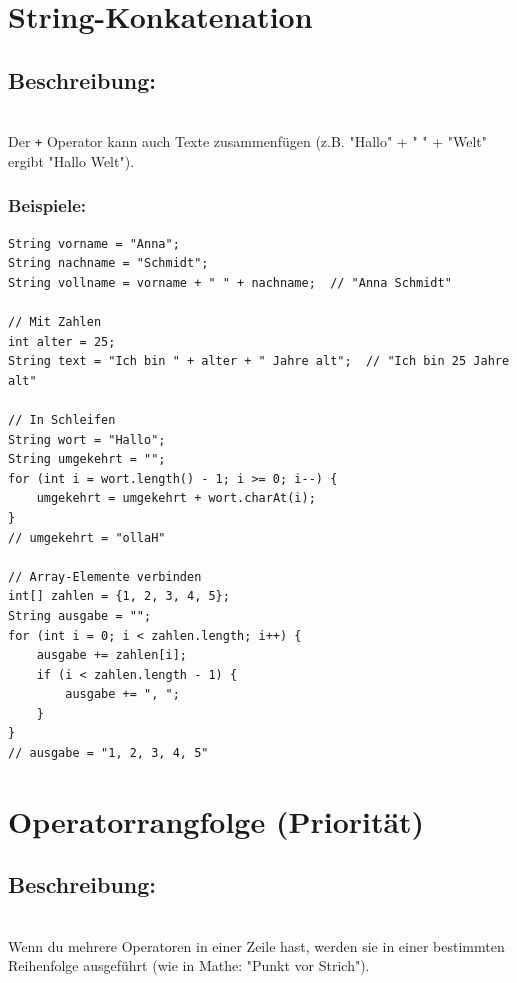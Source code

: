 \section*{String-Konkatenation}

\subsection*{Beschreibung:}\\
Der \texttt{+} Operator kann auch Texte zusammenfügen (z.B. "Hallo" + " " + "Welt" ergibt "Hallo Welt").

\subsubsection*{Beispiele:}
\begin{lstlisting}
String vorname = "Anna";
String nachname = "Schmidt";
String vollname = vorname + " " + nachname;  // "Anna Schmidt"

// Mit Zahlen
int alter = 25;
String text = "Ich bin " + alter + " Jahre alt";  // "Ich bin 25 Jahre alt"

// In Schleifen
String wort = "Hallo";
String umgekehrt = "";
for (int i = wort.length() - 1; i >= 0; i--) {
    umgekehrt = umgekehrt + wort.charAt(i);
}
// umgekehrt = "ollaH"

// Array-Elemente verbinden
int[] zahlen = {1, 2, 3, 4, 5};
String ausgabe = "";
for (int i = 0; i < zahlen.length; i++) {
    ausgabe += zahlen[i];
    if (i < zahlen.length - 1) {
        ausgabe += ", ";
    }
}
// ausgabe = "1, 2, 3, 4, 5"
\end{lstlisting}

\newpage


\section*{Operatorrangfolge (Priorität)}

\subsection*{Beschreibung:}\\
Wenn du mehrere Operatoren in einer Zeile hast, werden sie in einer bestimmten Reihenfolge ausgeführt (wie in Mathe: "Punkt vor Strich").

